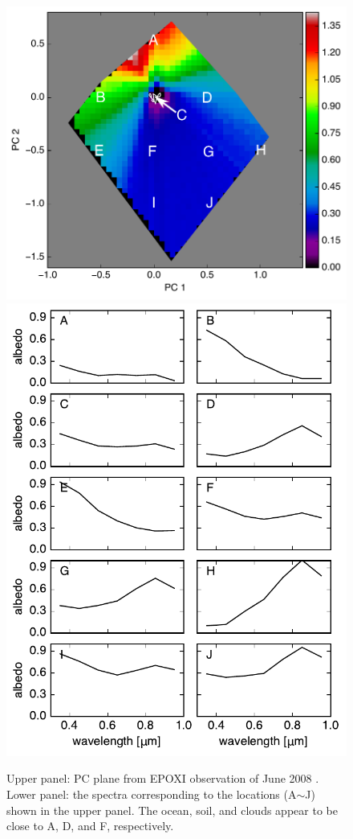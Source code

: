 \documentclass[iop,numberedappendix,apj]{emulateapj}
\begin{document}
\begin{figure}[tbh!]
    \begin{center}
	\includegraphics[width=\hsize]{raddata_2_PCplane_noreg_labels.pdf}
	\includegraphics[width=\hsize]{raddata_2_norm_spectra.pdf}
    \end{center}
    \caption{Upper panel: PC plane from EPOXI observation of June 2008 \citep{Livengood2011}. Lower panel: the spectra corresponding to the locations (A$\sim$J) shown in the upper panel. The ocean, soil, and clouds appear to be close to A, D, and F, respectively. }
\label{fig:EPOXI}
\end{figure}
\end{document}
